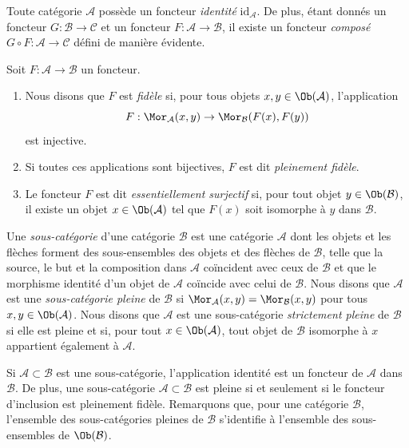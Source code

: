 \noindent
Toute catégorie $\mathcal{A}$ possède un foncteur
{\it identité} $\text{id}_\mathcal{A}$.
De plus, étant donnés un foncteur $G : \mathcal{B} \to \mathcal{C}$
et un foncteur $F : \mathcal{A} \to \mathcal{B}$, il existe
un foncteur {\it composé} $G \circ F : \mathcal{A} \to \mathcal{C}$
défini de manière évidente.

\begin{definition}
\label{definition-faithful}
Soit $F : \mathcal{A} \to \mathcal{B}$ un foncteur.
\begin{enumerate}
\item Nous disons que $F$ est {\it fidèle} si,
pour tous objets $x, y \in \Ob(\mathcal{A})$, l'application
$$
F : \Mor_\mathcal{A}(x, y) \to \Mor_\mathcal{B}(F(x), F(y))
$$
est injective.
\item Si toutes ces applications sont bijectives, $F$ est dit
{\it pleinement fidèle}.
\item
Le foncteur $F$ est dit {\it essentiellement surjectif} si, pour tout
objet $y \in \Ob(\mathcal{B})$, il existe un objet
$x \in \Ob(\mathcal{A})$ tel que $F(x)$ soit isomorphe à $y$ dans
$\mathcal{B}$.
\end{enumerate}
\end{definition}

\begin{definition}
\label{definition-subcategory}
Une {\it sous-catégorie} d'une catégorie $\mathcal{B}$ est une catégorie
$\mathcal{A}$ dont les objets et les flèches forment des sous-ensembles des
objets et des flèches de $\mathcal{B}$, telle que la source, le but et la
composition dans $\mathcal{A}$ coïncident avec ceux de $\mathcal{B}$ et que
le morphisme identité d'un objet de $\mathcal{A}$ coïncide avec celui de
$\mathcal{B}$. Nous disons que $\mathcal{A}$ est une
{\it sous-catégorie pleine} de $\mathcal{B}$ si
$\Mor_\mathcal{A}(x, y)
= \Mor_\mathcal{B}(x, y)$ pour tous
$x, y \in \Ob(\mathcal{A})$.
Nous disons que $\mathcal{A}$ est une sous-catégorie
{\it strictement pleine} de $\mathcal{B}$ si elle est pleine et si,
pour tout $x \in \Ob(\mathcal{A})$, tout objet de $\mathcal{B}$
isomorphe à $x$ appartient également à $\mathcal{A}$.
\end{definition}

\noindent
Si $\mathcal{A} \subset \mathcal{B}$ est une sous-catégorie, l'application
identité est un foncteur de $\mathcal{A}$ dans $\mathcal{B}$.
De plus, une sous-catégorie $\mathcal{A} \subset \mathcal{B}$
est pleine si et seulement si le foncteur d'inclusion est pleinement fidèle.
Remarquons que, pour une catégorie $\mathcal{B}$, l'ensemble des
sous-catégories pleines de $\mathcal{B}$ s'identifie à l'ensemble des sous-ensembles de
$\Ob(\mathcal{B})$.

